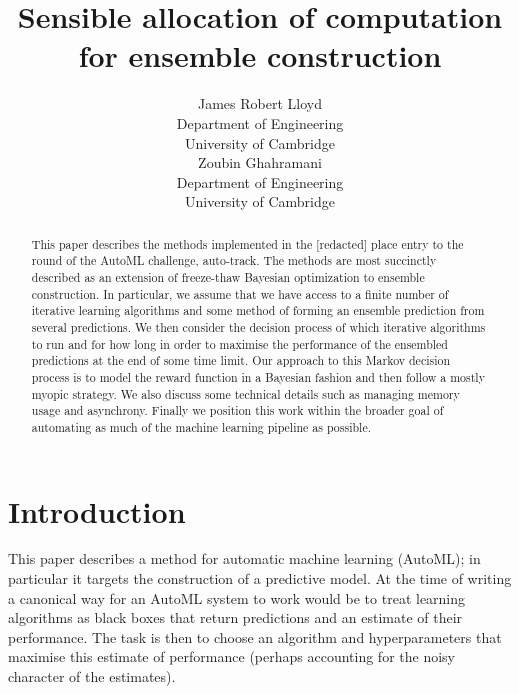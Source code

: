 \documentclass{article} %
\title{Sensible allocation of computation\\for ensemble construction}
\author{
James Robert Lloyd\\
Department of Engineering\\
University of Cambridge\\
\And
Zoubin Ghahramani\\
Department of Engineering\\
University of Cambridge\\
}
\begin{document}
\def\ParamSpace{\Theta}
\def\Param{\theta}
\def\Observation{y}
\def\ObservationVector{Y}
\def\ObservationSpace{\mathcal{Y}}
\def\Func{f}
\def\FuncTime{g}
\def\Noise{\varepsilon}
\def\Input{x}
\def\InputVector{X}
\def\InputSpace{\mathcal{X}}

\maketitle


\begin{abstract} 
This paper describes the methods implemented in the [redacted] place entry to the  round of the AutoML challenge, auto-track.
The methods are most succinctly described as an extension of freeze-thaw Bayesian optimization to ensemble construction.
In particular, we assume that we have access to a finite number of iterative learning algorithms and some method of forming an ensemble prediction from several predictions.
We then consider the decision process of which iterative algorithms to run and for how long in order to maximise the performance of the ensembled predictions at the end of some time limit.
Our approach to this Markov decision process is to model the reward function in a Bayesian fashion and then follow a mostly myopic strategy.
We also discuss some technical details such as managing memory usage and asynchrony.
Finally we position this work within the broader goal of automating as much of the machine learning pipeline as possible.
\end{abstract} 

\allowdisplaybreaks


\section{Introduction}

This paper describes a method for automatic machine learning (AutoML); in particular it targets the construction of a predictive model.
At the time of writing a canonical way for an AutoML system to work would be to treat learning algorithms as black boxes that return predictions and an estimate of their performance.
The task is then to choose an algorithm and hyperparameters that maximise this estimate of performance (perhaps accounting for the noisy character of the estimates).
\end{document}
